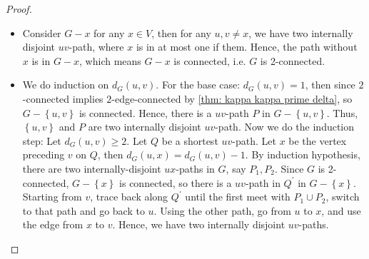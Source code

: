 \begin{proof}
\hfill
     \begin{itemize}
        \item [\((\impliedby )\)] Consider \(G - x\) for any \(x \in V\), then for any \(u, v \neq x\), we have two internally disjoint \(uv\)-path, where \(x\) is in at most one if them. Hence, the path without \(x\) is in \(G - x\), which means \(G - x\) is connected, i.e. \(G\) is 2-connected.
        \item [\((\implies)\)] We do induction on \(d_G(u, v)\). For the base case: \(d_G(u, v) = 1\), then since \(2\)-connected implies \(2\)-edge-connected by \autoref{thm: kappa kappa prime delta}, so \(G - \left\{ u, v \right\} \) is connected. Hence, there is a \(uv\)-path \(P\) in \(G - \left\{ u, v \right\} \). Thus, \(\left\{ u, v \right\} \) and \(P\) are two internally disjoint \(uv\)-path. Now we do the induction step: Let \(d_G(u, v) \ge 2\). Let \(Q\) be a shortest \(uv\)-path. Let \(x\) be the vertex preceding \(v\) on \(Q\), then \(d_G(u, x) = d_G(u, v) - 1\). By induction hypothesis, there are two internally-disjoint \(ux\)-paths in \(G\), say \(P_1, P_2\). Since \(G\) is 2-connected, \(G - \left\{ x \right\} \) is connected, so there is a \(uv\)-path in \(Q^{\prime}\) in \(G - \left\{ x \right\} \). Starting from \(v\), trace back along \(Q^{\prime} \) until the first meet with \(P_1 \cup P_2\), switch to that path and go back to \(u\). Using the other path, go from \(u\) to \(x\), and use the edge from \(x\) to \(v\). Hence, we have two internally disjoint \(uv\)-paths.                            
        \begin{center}
\end{center}
\end{itemize}
\end{proof}
